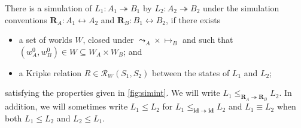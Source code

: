 \documentclass[acmsmall,screen,review,anonymous]{acmart}
\renewcommand{\preceq}{\le}
\newcommand{\intl}[1]{#1^0}
\newcommand{\idsc}{\mathbf{id}} %
\begin{document}
\begin{definition}
There is a simulation
of $L_1 : A_1 \twoheadrightarrow B_1$
by $L_2 : A_2 \twoheadrightarrow B_2$
under the simulation conventions
$\mathbf{R}_A : A_1 \leftrightarrow A_2$ and
$\mathbf{R}_B : B_1 \leftrightarrow B_2$,
if there exists
\begin{itemize}
\item a set of worlds $W$,
closed under ${\leadsto_A} \times {\mapsto_B}$ and
such that
$(\intl{w}_A, \intl{w}_B) \in W \subseteq W_A \times W_B$;
and
\item
a Kripke relation $R \in \mathcal{R}_W(S_1, S_2)$
between the states of $L_1$ and $L_2$;
\end{itemize}
satisfying the properties given in
\autoref{fig:simint}.
We will write
$L_1 \preceq_{\mathbf{R}_A \twoheadrightarrow \mathbf{R}_B} L_2$.
In addition,
we will sometimes write
$L_1 \le L_2$ for $L_1 \le_{\idsc \twoheadrightarrow \idsc} L_2$ and
$L_1 \equiv L_2$ when both $L_1 \le L_2$ and $L_2 \le L_1$.
\end{definition}

\end{document}
